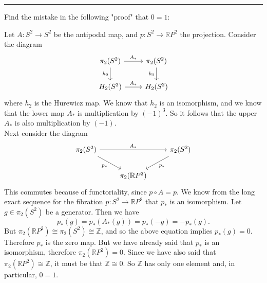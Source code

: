 \documentclass[letterpaper, 12pt]{article}
\begin{document}
\noindent\rule{7in}{2.8pt}
\begin{problem}{6}
Find the mistake in the following "proof" that \(0=1\):

Let \(A:S^2\rightarrow S^2\) be the antipodal map, and \(p:S^2\rightarrow \mathbb{R}P^2\) the projection. Consider the diagram 
\[\begin{tikzcd}
	{\pi_2(S^2)} & {\pi_2(S^2)} \\
	{H_2(S^2)} & {H_2(S^2)}
	\arrow["{A_*}", from=1-1, to=1-2]
	\arrow["{h_2}"', from=1-1, to=2-1]
	\arrow["{h_2}"', from=1-2, to=2-2]
	\arrow["{A_*}", from=2-1, to=2-2]
\end{tikzcd}\]
where \(h_2\) is the Hurewicz map. We know that \(h_2\) is an isomorphism, and we know that the lower map \(A_*\) is multiplication by \((-1)^3\). So it follows that the upper \(A_*\) is also multiplication by \((-1)\). \\ 
Next consider the diagram 
\[\begin{tikzcd}
	{\pi_2(S^2)} && {\pi_2(S^2)} \\
	& {\pi_2(\mathbb{R}P^2)}
	\arrow["{A_*}", from=1-1, to=1-3]
	\arrow["{p_*}"', from=1-1, to=2-2]
	\arrow["{p_*}", from=1-3, to=2-2]
\end{tikzcd}\]
This commutes because of functoriality, since \(p\circ A=p\). We know from the long exact sequence for the fibration \(p:S^2\rightarrow \mathbb{R}P^2\) that \(p_*\) is an isomorphism. Let \(g\in \pi_2(S^2)\) be a generator. Then we have 
\[p_*(g)=p_*(A_*(g))=p_*(-g)=-p_*(g).\]
But \(\pi_2(\mathbb{R}P^2)\cong \pi_2(S^2)\cong \mathbb{Z}\), and so the above equation implies \(p_*(g)=0\). Therefore \(p_*\) is the zero map. But we have already said that \(p_*\) is an isomorphism, therefore \(\pi_2(\mathbb{R}P^2)=0\). Since we have also said that \(\pi_2(\mathbb{R}P^2)\cong \mathbb{Z}\), it must be that \(\mathbb{Z}\cong 0\). So \(\mathbb{Z}\) has only one element and, in particular, \(0=1\). 
\end{problem}
\end{document}
